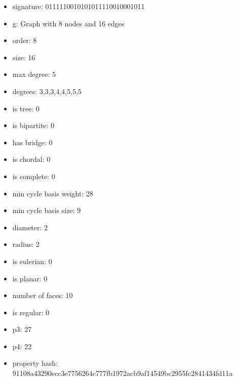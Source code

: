 \begin{itemize}
\item signature: 0111110010101011110010001011
\item g: Graph with 8 nodes and 16 edges
\item order: 8
\item size: 16
\item max degree: 5
\item degrees: 3,3,3,4,4,5,5,5
\item is tree: 0
\item is bipartite: 0
\item has bridge: 0
\item is chordal: 0
\item is complete: 0
\item min cycle basis weight: 28
\item min cycle basis size: 9
\item diameter: 2
\item radius: 2
\item is eulerian: 0
\item is planar: 0
\item number of faces: 10
\item is regular: 0
\item p3: 27
\item p4: 22
\item property hash: 91108a43290ecc3e7756264c777fb1972acb9af14549bc2955fc2841434fd11a
\end{itemize}
\newpage
\begin{figure}
\end{figure}
